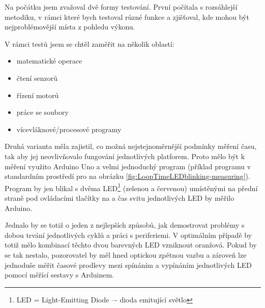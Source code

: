 Na počátku jsem zvažoval dvě formy testování. První počítala s rozsáhlejší metodiku, v rámci které bych testoval různé funkce \EVthree{ } a zjišťoval, kde mohou být nejproblémovější místa z pohledu výkonu.

V rámci testů jsem se chtěl zaměřit na několik oblastí: %

\begin{itemize}
	\item matematické operace
	\item čtení senzorů
	\item řízení motorů
	\item práce se soubory
	\item vícevláknové/procesové programy
\end{itemize}  

Druhá varianta měla zajistil, co možná nejstejnoměrnější podmínky měření času, tak aby jej neovlivňovalo fungování jednotlivých platforem. 
Proto mělo být k měření využito Arduino Uno a velmi jednoduchý program  (příklad programu v standardním prostředí pro \EVthree{ }na obrázku \ref{fig:LoopTimeLEDblinking-measuring}).
Program by jen blikal s dvěma LED\footnote{LED = Light-Emitting Diode –- dioda emitující světlo} (zelenou a červenou) umístěnými na přední straně pod ovládacími tlačítky na  a čas svitu jednotlivých LED by měřilo Arduino.




Jednalo by se totiž o jeden z nejlepších způsobů, jak demostrovat problémy s dobou trvání jednotlivých cyklů a práci s periferiemi. 
V optimálním případě by totiž mělo kombinací těchto dvou barevných LED vzniknout oranžová. 
Pokud by se tak nestalo, pozorovatel by měl hned optickou zpětnou vazbu a zároveň lze jednoduše měřit časové prodlevy mezi spínáním a vypínáním jednotlivých LED pomocí měřící sestavy s Arduinem.

